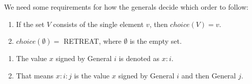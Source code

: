 \documentclass{beamer}
\theoremstyle{conjecture1}
\theoremstyle{conjecture2}
\begin{document}
\begin{frame}
    We need some requirements for how the generals decide which order to follow:
    \begin{enumerate}[label={\arabic{enumi}.}]
        \item<2-> If the set $V$ consists of the single element $v$, then $choice(V) = v$.
        \item<3> $choice(\emptyset)=$ RETREAT, where $\emptyset$ is the empty set.
    \end{enumerate}
\end{frame}

\begin{frame}
    \begin{enumerate}[label={$\bullet$}]
        \item<1-> The value $x$ signed by General $i$ is denoted as $x:i$.
        \item<2> That means $x:i:j$ is the value $x$ signed by General $i$ and then General $j$.
    \end{enumerate}
\end{frame}
\end{document}
